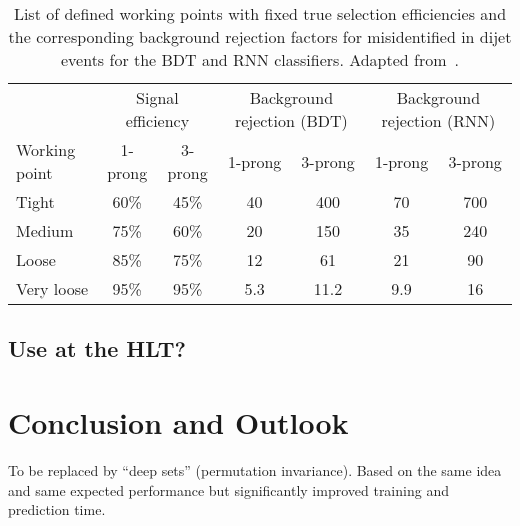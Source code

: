 \begin{table}
  \centering

  \caption{List of defined working points with fixed true \tauhadvis
    selection efficiencies and the corresponding background rejection
    factors for misidentified \tauhadvis in dijet events for the BDT
    and RNN classifiers. Adapted from~\cite{ATL-PHYS-PUB-2019-033}.}%
  \label{tab:rnn_wps}

  \begin{tabular}{lcccccc}
    \toprule
                  & \multicolumn{2}{c}{Signal efficiency} & \multicolumn{2}{c}{Background rejection (BDT)} & \multicolumn{2}{c}{Background rejection (RNN)} \\
    Working point  & 1-prong & 3-prong & 1-prong & 3-prong & 1-prong & 3-prong \\
    \midrule
    Tight          & 60\%    & 45\%    & 40      & 400  & 70   & 700 \\
    Medium         & 75\%    & 60\%    & 20      & 150  & 35   & 240 \\
    Loose          & 85\%    & 75\%    & 12      & 61   & 21   & 90  \\
    Very loose     & 95\%    & 95\%    & 5.3     & 11.2 & 9.9  & 16  \\
    \bottomrule
  \end{tabular}
\end{table}

\subsection{Use at the HLT?}

\cite{ATL-DAQ-PUB-2019-001}


\section{Conclusion and Outlook}

To be replaced by ``deep sets'' (permutation invariance). Based on the
same idea and same expected performance but significantly improved
training and prediction time.

